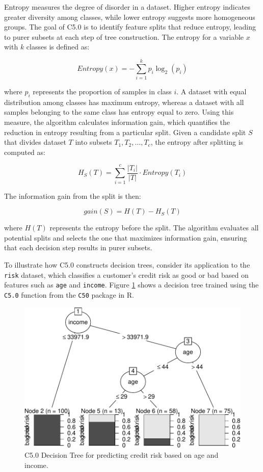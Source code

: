 \documentclass[
]{book}
\newcommand{\passthrough}[1]{#1}
\theoremstyle{definition}
\theoremstyle{definition}
\theoremstyle{definition}
\theoremstyle{definition}
\theoremstyle{remark}
\begin{document}
Entropy measures the degree of disorder in a dataset. Higher entropy indicates greater diversity among classes, while lower entropy suggests more homogeneous groups. The goal of C5.0 is to identify feature splits that reduce entropy, leading to purer subsets at each step of tree construction. The entropy for a variable \(x\) with \(k\) classes is defined as:

\[
Entropy(x) = - \sum_{i=1}^k p_i \log_2(p_i)
\]

where \(p_i\) represents the proportion of samples in class \(i\). A dataset with equal distribution among classes has maximum entropy, whereas a dataset with all samples belonging to the same class has entropy equal to zero. Using this measure, the algorithm calculates information gain, which quantifies the reduction in entropy resulting from a particular split. Given a candidate split \(S\) that divides dataset \(T\) into subsets \(T_1, T_2, \dots, T_c\), the entropy after splitting is computed as:

\[
H_S(T) = \sum_{i=1}^c \frac{|T_i|}{|T|} \cdot Entropy(T_i)
\]

The information gain from the split is then:

\[
gain(S) = H(T) - H_S(T)
\]

where \(H(T)\) represents the entropy before the split. The algorithm evaluates all potential splits and selects the one that maximizes information gain, ensuring that each decision step results in purer subsets.

To illustrate how C5.0 constructs decision trees, consider its application to the \passthrough{\lstinline!risk!} dataset, which classifies a customer's credit risk as good or bad based on features such as \passthrough{\lstinline!age!} and \passthrough{\lstinline!income!}. Figure \ref{fig:tree-C50} shows a decision tree trained using the \passthrough{\lstinline!C5.0!} function from the \passthrough{\lstinline!C50!} package in R.

\begin{figure}

{\centering \includegraphics[width=0.65\linewidth]{tree_files/figure-latex/tree-C50-1} 

}

\caption{C5.0 Decision Tree for predicting credit risk based on age and income.}\label{fig:tree-C50}
\end{figure}
\end{document}
